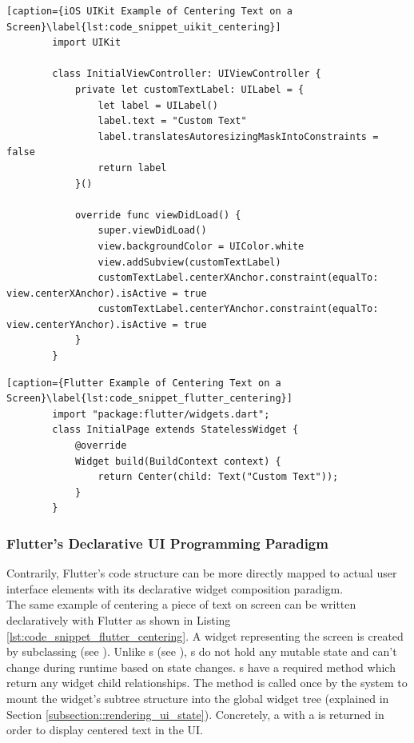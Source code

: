 \begin{minipage}{\linewidth}
    \begin{lstlisting}[caption={iOS UIKit Example of Centering Text on a Screen}\label{lst:code_snippet_uikit_centering}]
        import UIKit
    
        class InitialViewController: UIViewController {
            private let customTextLabel: UILabel = {
                let label = UILabel()
                label.text = "Custom Text"
                label.translatesAutoresizingMaskIntoConstraints = false
                return label
            }()
    
            override func viewDidLoad() {
                super.viewDidLoad()
                view.backgroundColor = UIColor.white
                view.addSubview(customTextLabel)
                customTextLabel.centerXAnchor.constraint(equalTo: view.centerXAnchor).isActive = true
                customTextLabel.centerYAnchor.constraint(equalTo: view.centerYAnchor).isActive = true
            }
        }
    \end{lstlisting}
\end{minipage}

\begin{minipage}{\linewidth}
    \begin{lstlisting}[caption={Flutter Example of Centering Text on a Screen}\label{lst:code_snippet_flutter_centering}]
        import "package:flutter/widgets.dart";
        class InitialPage extends StatelessWidget {
            @override
            Widget build(BuildContext context) {
                return Center(child: Text("Custom Text"));
            }
        }
    \end{lstlisting}
\end{minipage}

\subsubsection{Flutter's Declarative UI Programming Paradigm}
Contrarily, Flutter's code structure can be more directly mapped to actual user interface elements with its declarative widget composition paradigm.\\
The same example of centering a piece of text on screen can be written declaratively with Flutter as shown in Listing \ref{lst:code_snippet_flutter_centering}.
A widget representing the screen is created by subclassing  (see \cite{StatelessWidgetDocumentation2021}). 
Unlike s (see \cite{StatefulWidgetDocumentation2021}), s do not hold any mutable state and can't change during runtime based on state changes. 
s have a required  method which return any widget child relationships. The method is called 
once by the system to mount the widget's subtree structure into the global widget tree (explained in Section \ref{subsection::rendering_ui_state}).
Concretely, a  with a  is returned in order to display centered text in the UI.\\

